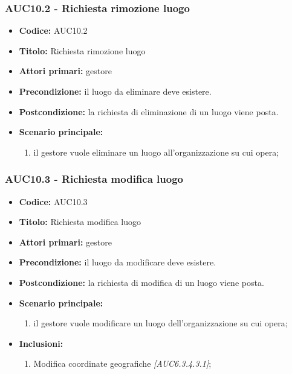 \documentclass[casi-duso]{subfiles}
\begin{document}
\subsubsection{AUC10.2 - Richiesta rimozione luogo}%
\label{subsub:AUC10.2}
\begin{itemize}
  \item \textbf{Codice:} AUC10.2
  \item \textbf{Titolo:} Richiesta rimozione luogo
  \item \textbf{Attori primari:} gestore
  \item \textbf{Precondizione:} il luogo da eliminare deve esistere.
  \item \textbf{Postcondizione:} la richiesta di eliminazione di un luogo viene posta.
  \item \textbf{Scenario principale:}
  \begin{enumerate}
    \item il gestore vuole eliminare un luogo all'organizzazione su cui opera;
  \end{enumerate}
\end{itemize}

\subsubsection{AUC10.3 - Richiesta modifica luogo}%
\label{subsub:AUC10.3}
\begin{itemize}
  \item \textbf{Codice:} AUC10.3
  \item \textbf{Titolo:} Richiesta modifica luogo
  \item \textbf{Attori primari:} gestore
  \item \textbf{Precondizione:} il luogo da modificare deve esistere.
  \item \textbf{Postcondizione:} la richiesta di modifica di un luogo viene posta.
  \item \textbf{Scenario principale:}
  \begin{enumerate}
    \item il gestore vuole modificare un luogo dell'organizzazione su cui opera;
  \end{enumerate}
  \item \textbf{Inclusioni:}
  \begin{enumerate}
    \item Modifica coordinate geografiche \emph{[AUC6.3.4.3.1]};
  \end{enumerate}
\end{itemize}
\end{document}
